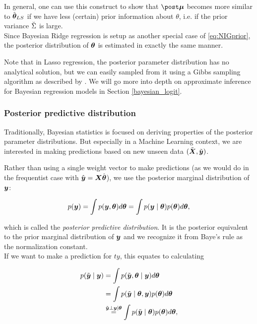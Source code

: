 In general, one can use this construct to show that $\mupo$ becomes more similar to $\hat{\bm{\theta}}_{LS}$ if we have less (certain) prior information about $\theta$, i.e. if the prior variance $\breve{\Sigma}$ is large.\\

Since Bayesian Ridge regression is setup as another special case of \eqref{eq:NIGprior}, the posterior distribution of $\bm{\theta}$ is estimated in exactly the same manner.

Note that in Lasso regression, the posterior parameter distribution has no analytical solution, but we can easily sampled from it using a Gibbs sampling algorithm as described by \citet{park_bayesian_2008}.
We will go more into depth on approximate inference for Bayesian regression models in Section \ref{bayesian_logit}.

\subsubsection*{Posterior predictive distribution}
Traditionally, Bayesian statistics is focused on deriving properties of the posterior parameter distributions. But especially in a Machine Learning context, we are interested in making predictions based on new unseen data $(\tilde{\bm{X}}, \tilde{\bm{y}})$.

Rather than using a single weight vector to make predictions (as we would do in the frequentist case with $\hat{\bm{y}} = \bm{X} \hat{\bm{\theta}}$), we use the posterior marginal distribution of $\bm{y}$:

\begin{equation*}
    p(\bm{y}) = \int p(\bm{y}, \bm{\theta}) d\bm{\theta} = \int p(\bm{y} \mid \bm{\theta}) p(\bm{\theta}) d\bm{\theta},
\end{equation*}

which is called the \textit{posterior predictive distribution}. It is the posterior equivalent to the prior marginal distribution of $\bm{y}$ and we recognize it from Baye's rule as the normalization constant.\\

If we want to make a prediction for $ty$, this equates to calculating

\begin{equation*}
    \begin{aligned}
        p(\tilde{\bm{y}} \mid \bm{y}) &= \int p(\tilde{\bm{y}}, \bm{\theta} \mid \bm{y}) d \bm{\theta} \\
        &= \int p(\tilde{\bm{y}} \mid \bm{\theta}, \bm{y}) p(\bm{\theta}) d \bm{\theta} \\
        &\overset{\tilde{\bm{y}} \perp \bm{y} \mid \bm{\theta}}{=}  \int p(\tilde{\bm{y}} \mid \bm{\theta}) p(\bm{\theta}) d \bm{\theta},
    \end{aligned}
\end{equation*}

